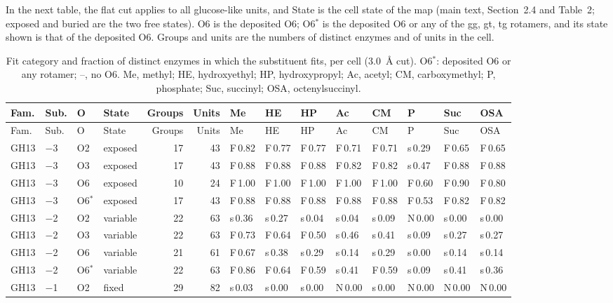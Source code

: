 \documentclass[preprint,12pt]{elsarticle}
\begin{document}
{\scriptsize\setlength{\tabcolsep}{1.4pt}
In the next table, the flat cut applies to all glucose-like units, and State is the cell state of the map (main text, Section~2.4 and Table~2; exposed and buried are the two free states). O6 is the deposited O6; O6$^\ast$ is the deposited O6 or any of the gg, gt, tg rotamers, and its state shown is that of the deposited O6. Groups and units are the numbers of distinct enzymes and of units in the cell.

\begin{longtable}{llllrrllllllll}
\caption{Fit category and fraction of distinct enzymes in which the substituent fits, per cell (3.0~\AA{} cut). O6$^\ast$: deposited O6 or any rotamer; --, no O6. Me, methyl; HE, hydroxyethyl; HP, hydroxypropyl; Ac, acetyl; CM, carboxymethyl; P, phosphate; Suc, succinyl; OSA, octenylsuccinyl.}\label{tab:fitcells}\\
\toprule
Fam. & Sub. & O & State & Groups & Units & Me & HE & HP & Ac & CM & P & Suc & OSA\\
\midrule
\endfirsthead
\toprule
Fam. & Sub. & O & State & Groups & Units & Me & HE & HP & Ac & CM & P & Suc & OSA\\
\midrule
\endhead
\bottomrule
\endfoot
GH13 & $-$3 & O2 & exposed & 17 & 43 & F\,0.82 & F\,0.77 & F\,0.77 & F\,0.71 & F\,0.71 & s\,0.29 & F\,0.65 & F\,0.65\\
GH13 & $-$3 & O3 & exposed & 17 & 43 & F\,0.88 & F\,0.88 & F\,0.88 & F\,0.82 & F\,0.82 & s\,0.47 & F\,0.88 & F\,0.88\\
GH13 & $-$3 & O6 & exposed & 10 & 24 & F\,1.00 & F\,1.00 & F\,1.00 & F\,1.00 & F\,1.00 & F\,0.60 & F\,0.90 & F\,0.80\\
GH13 & $-$3 & O6$^\ast$ & exposed & 17 & 43 & F\,0.88 & F\,0.88 & F\,0.88 & F\,0.88 & F\,0.88 & F\,0.53 & F\,0.82 & F\,0.82\\
GH13 & $-$2 & O2 & variable & 22 & 63 & s\,0.36 & s\,0.27 & s\,0.04 & s\,0.04 & s\,0.09 & N\,0.00 & s\,0.00 & s\,0.00\\
GH13 & $-$2 & O3 & variable & 22 & 63 & F\,0.73 & F\,0.64 & F\,0.50 & s\,0.46 & s\,0.41 & s\,0.09 & s\,0.27 & s\,0.27\\
GH13 & $-$2 & O6 & variable & 21 & 61 & F\,0.67 & s\,0.38 & s\,0.29 & s\,0.14 & s\,0.29 & s\,0.00 & s\,0.14 & s\,0.14\\
GH13 & $-$2 & O6$^\ast$ & variable & 22 & 63 & F\,0.86 & F\,0.64 & F\,0.59 & s\,0.41 & F\,0.59 & s\,0.09 & s\,0.41 & s\,0.36\\
GH13 & $-$1 & O2 & fixed & 29 & 82 & s\,0.03 & s\,0.00 & s\,0.00 & N\,0.00 & s\,0.00 & N\,0.00 & N\,0.00 & N\,0.00\\

\end{longtable}}
\end{document}

